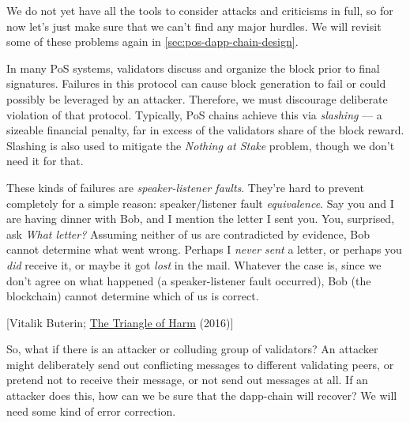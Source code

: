 We do not yet have all the tools to consider attacks and criticisms in full, so for now let's just make sure that we can't find any major hurdles.
We will revisit some of these problems again in \autoref{sec:pos-dapp-chain-design}.


In many PoS systems, validators discuss and organize the block prior to final signatures.
Failures in this protocol can cause block generation to fail or could possibly be leveraged by an attacker.
Therefore, we must discourage deliberate violation of that protocol.
Typically, PoS chains achieve this via \emph{slashing} --- a sizeable financial penalty, far in excess of the validators share of the block reward.
Slashing is also used to mitigate the \emph{Nothing at Stake} problem, though we don't need it for that.

These kinds of failures are \emph{speaker-listener faults}.
They're hard to prevent completely for a simple reason: speaker/listener fault \emph{equivalence}.
Say you and I are having dinner with Bob, and I mention the letter I sent you.
You, surprised, ask \emph{What letter?}
Assuming neither of us are contradicted by evidence, Bob cannot determine what went wrong.
Perhaps I \emph{never sent} a letter, or perhaps you \emph{did} receive it, or maybe it got \emph{lost} in the mail.
Whatever the case is, since we don't agree on what happened (a speaker-listener fault occurred), Bob (the blockchain) cannot determine which of us is correct.

[Vitalik Buterin; \href{\linkButerinTriangleOfHarm}{The Triangle of Harm} (2016)]

So, what if there is an attacker or colluding group of validators?
An attacker might deliberately send out conflicting messages to different validating peers, or pretend not to receive their message, or not send out messages at all.
If an attacker does this, how can we be sure that the dapp-chain will recover?
We will need some kind of error correction.

